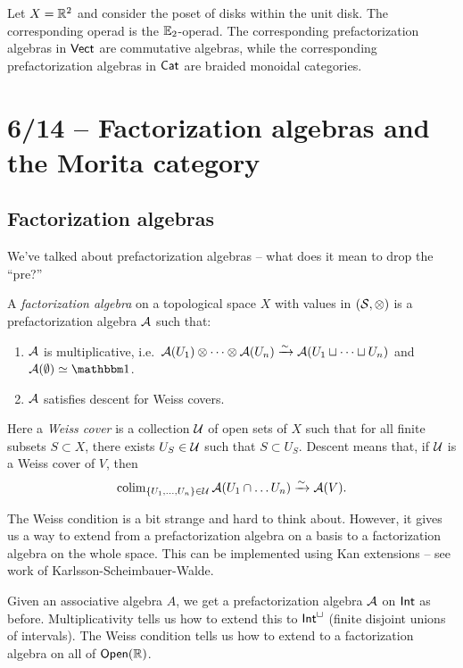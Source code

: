 \begin{ex}
	Let $X = \mathbb{R}^2$ and consider the poset of disks within the unit disk.
	The corresponding operad is the $\mathbb{E}_2$-operad.
	The corresponding prefactorization algebras in $\mathsf{Vect}$ are commutative algebras, while the corresponding prefactorization algebras in $\mathsf{Cat}$ are braided monoidal categories.
\end{ex}

\section{6/14 -- Factorization algebras and the Morita category}

\subsection{Factorization algebras}

We've talked about prefactorization algebras -- what does it mean to drop the ``pre?''

\begin{dfn}
	A \emph{factorization algebra} on a topological space $X$ with values in $(\mathcal{S}, \otimes)$ is a prefactorization algebra $\mathcal{A}$ such that:
	\begin{enumerate}
		\item $\mathcal{A}$ is multiplicative, i.e.\ $\mathcal{A}(U_1) \otimes \dots \otimes \mathcal{A}(U_n) \xrightarrow{\sim} \mathcal{A}(U_1 \sqcup \dots \sqcup U_n)$ and $\Ac(\emptyset) \simeq \onebb$.
		\item $\mathcal{A}$ satisfies descent for Weiss covers.
	\end{enumerate}
	Here a \emph{Weiss cover} is a collection $\mathcal{U}$ of open sets of $X$ such that for all finite subsets $S \subset X$, there exists $U_S \in \mathcal{U}$ such that $S \subset U_S$.
	Descent means that, if $\mathcal{U}$ is a Weiss cover of $V$, then
	\[
		\operatorname{colim}_{\{ U_1, \dots, U_n \} \in \mathcal{U}} \mathcal{A}(U_1 \cap \dots U_n) \xrightarrow{\sim} \mathcal{A}(V).
	\]
\end{dfn}

The Weiss condition is a bit strange and hard to think about.
However, it gives us a way to extend from a prefactorization algebra on a basis to a factorization algebra on the whole space.
This can be implemented using Kan extensions -- see work of Karlsson-Scheimbauer-Walde.

\begin{ex}
	Given an associative algebra $A$, we get a prefactorization algebra $\mathcal{A}$ on $\mathsf{Int}$ as before.
	Multiplicativity tells us how to extend this to $\mathsf{Int}^{\sqcup}$ (finite disjoint unions of intervals).
	The Weiss condition tells us how to extend to a factorization algebra on all of $\mathsf{Open}(\mathbb{R})$.
\end{ex}

